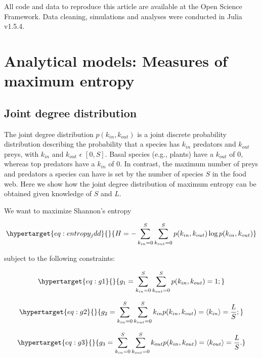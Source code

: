 \documentclass[11pt]{article}
\begin{document}
All code and data to reproduce this article are available at the Open
Science Framework. Data cleaning, simulations and analyses were
conducted in Julia v1.5.4.

\hypertarget{analytical-models-measures-of-maximum-entropy}{%
\section{Analytical models: Measures of maximum
entropy}\label{analytical-models-measures-of-maximum-entropy}}

\hypertarget{joint-degree-distribution}{%
\subsection{Joint degree distribution}\label{joint-degree-distribution}}

The joint degree distribution \(p(k_{in},k_{out})\) is a joint discrete
probability distribution describing the probability that a species has
\(k_{in}\) predators and \(k_{out}\) preys, with \(k_{in}\) and
\(k_{out}\) \(\epsilon\) \([0, S]\). Basal species (e.g., plants) have a
\(k_{out}\) of \(0\), whereas top predators have a \(k_{in}\) of \(0\).
In contrast, the maximum number of preys and predators a species can
have is set by the number of species \(S\) in the food web. Here we show
how the joint degree distribution of maximum entropy can be obtained
given knowledge of \(S\) and \(L\).

We want to maximize Shannon's entropy

\begin{equation}\protect\hypertarget{eq:entropy_jdd}{}{H = -\sum_{k_{in}=0}^S\sum_{k_{out}=0}^S p(k_{in},k_{out}) \log p(k_{in},k_{out})}\label{eq:entropy_jdd}\end{equation}

subject to the following constraints:

\begin{equation}\protect\hypertarget{eq:g1}{}{g_1 = \sum_{k_{in}=0}^S\sum_{k_{out}=0}^S p(k_{in},k_{out}) = 1;}\label{eq:g1}\end{equation}

\begin{equation}\protect\hypertarget{eq:g2}{}{g_2 = \sum_{k_{in}=0}^S\sum_{k_{out}=0}^S k_{in} p(k_{in},k_{out}) = \langle k_{in} \rangle = \frac{L}{S};}\label{eq:g2}\end{equation}

\begin{equation}\protect\hypertarget{eq:g3}{}{g_3 = \sum_{k_{in}=0}^S\sum_{k_{out}=0}^S k_{out} p(k_{in},k_{out}) = \langle k_{out} \rangle = \frac{L}{S}.}\label{eq:g3}\end{equation}
\end{document}
